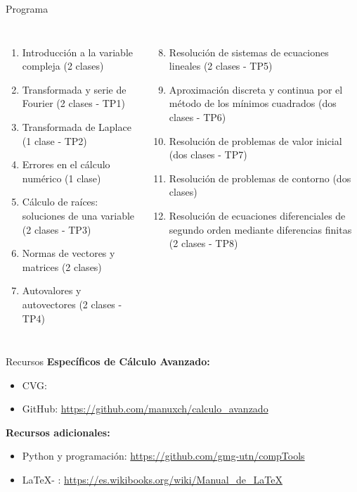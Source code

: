 \documentclass[9pt, aspectratio=169]{beamer}
\begin{document}
\begin{frame}{Programa}
\begin{columns}[t]
\cx 
\begin{enumerate}
    \item Introducción a la variable compleja (2 clases)
    \item Transformada y serie de Fourier (2 clases - TP1)
    \item Transformada de Laplace (1 clase - TP2)
    \item Errores en el cálculo numérico (1 clase)
    \item Cálculo de raíces: soluciones de una variable (2 clases - TP3)
    \item Normas de vectores y matrices (2 clases)
    \item Autovalores y autovectores (2 clases - TP4)
\end{enumerate}
\cx 
\begin{enumerate}
    \setcounter{enumi}{7}
    \item Resolución de sistemas de ecuaciones lineales (2 clases - TP5)
    \item Aproximación discreta y continua por el método de los mínimos cuadrados (dos clases - TP6)
    \item Resolución de problemas de valor inicial (dos clases - TP7)
    \item Resolución de problemas de contorno (dos clases)
    \item Resolución de ecuaciones diferenciales de segundo orden mediante diferencias finitas (2 clases - TP8)
\end{enumerate}
\end{columns}
\vspace{1em}
\begin{columns}[c]
\cx
\centering
{}

\cx
\centering
{}
\end{columns}
\end{frame}

\begin{frame}{Recursos}
\textbf{Específicos de Cálculo Avanzado:}
\begin{itemize}
    \item CVG: \url{}
    \item GitHub: \url{https://github.com/manuxch/calculo_avanzado}
\end{itemize}

\textbf{Recursos adicionales:}
\begin{itemize}
    \item Python y programación: \url{https://github.com/gmg-utn/compTools}
    \item \LaTeX - \XeLaTeX: \url{https://es.wikibooks.org/wiki/Manual_de_LaTeX}
\end{itemize}
\end{frame}
\end{document}
